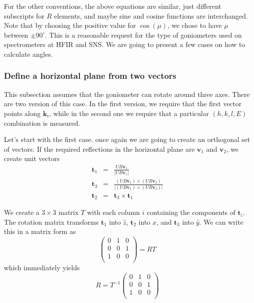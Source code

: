 \documentclass[prb]{revtex4}%
\begin{document}
For the other conventions, the above equations are similar, just different subscripts for $R$ elements, and maybe sine and
cosine functions are interchanged.
Note that by choosing the positive value for $\cos(\mu)$, we chose to have $\mu$ between $\pm90^\circ$. This is a
reasonable request for the type of goniometers used on spectrometers at HFIR and SNS. We are going to present
a few cases on how to calculate angles.


\subsubsection{Define a horizontal plane from two vectors}
This subsection assumes that the goniometer can rotate around three axes.
There are two version of this case. In the first version, we require that the first vector points along $\textbf{k}_i$,
while in the second one we require that a particular $(h, k, l, E)$ combination is measured.

Let's start with the first case. once again we are going to create an orthogonal set of vectors. If the required
reflections in the horizontal plane are $\textbf{v}_1$ and $\textbf{v}_2$, we create unit vectors
\begin{eqnarray}
  \textbf{t}_1 &=& \frac{UB\textbf{v}_1}{|UB\textbf{v}_1|} \\
  \textbf{t}_3 &=& \frac{(UB\textbf{v}_1)\times(UB\textbf{v}_2)}{|(UB\textbf{v}_1)\times(UB\textbf{v}_2)|} \\
  \textbf{t}_2 &=& \textbf{t}_3\times\textbf{t}_1
\end{eqnarray}

We create a $3\times3$ matrix $T$ with each column $i$ containing the components of $\textbf{t}_i$. The rotation
matrix transforms $\textbf{t}_1$ into $\widehat{z}$, $\textbf{t}_2$ into $\widehat{x}$, and $\textbf{t}_3$ into $\widehat{y}$.
We can write this in a matrix form as
\begin{equation}\label{RT}
    \left(
      \begin{array}{ccc}
        0 & 1 & 0 \\
        0 & 0 & 1 \\
        1 & 0 & 0 \\
      \end{array}
    \right)
    = R T
\end{equation}
which immediately yields
\begin{equation}
    R=T^{-1}\left(
      \begin{array}{ccc}
        0 & 1 & 0 \\
        0 & 0 & 1 \\
        1 & 0 & 0 \\
      \end{array}
    \right)
\end{equation}
\end{document}
